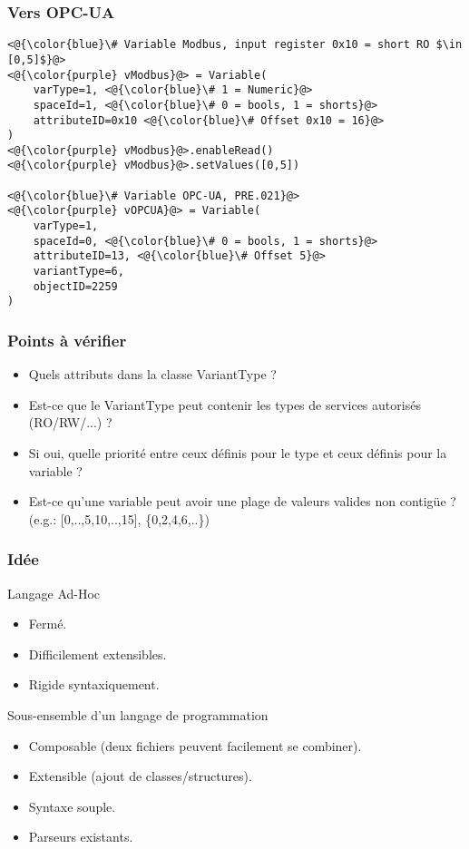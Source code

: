\documentclass{beamer}
\begin{document}
\begin{frame}[fragile]
    \frametitle{Vers OPC-UA}

    \begin{lstlisting}
<@{\color{blue}\# Variable Modbus, input register 0x10 = short RO $\in [0,5]$}@>
<@{\color{purple} vModbus}@> = Variable(
    varType=1, <@{\color{blue}\# 1 = Numeric}@>
    spaceId=1, <@{\color{blue}\# 0 = bools, 1 = shorts}@>
    attributeID=0x10 <@{\color{blue}\# Offset 0x10 = 16}@>
)
<@{\color{purple} vModbus}@>.enableRead()
<@{\color{purple} vModbus}@>.setValues([0,5])

<@{\color{blue}\# Variable OPC-UA, PRE.021}@>
<@{\color{purple} vOPCUA}@> = Variable(
    varType=1,
    spaceId=0, <@{\color{blue}\# 0 = bools, 1 = shorts}@>
    attributeID=13, <@{\color{blue}\# Offset 5}@>
    variantType=6,
    objectID=2259
)
    \end{lstlisting}
\end{frame}

\begin{frame}
    \frametitle{Points à vérifier}

    \begin{itemize}
        \item Quels attributs dans la classe VariantType ?
            \vfill
        \item Est-ce que le VariantType peut contenir les types de services autorisés (RO/RW/...) ?
            \vfill
        \item Si oui, quelle priorité entre ceux définis pour le type et ceux définis pour la variable ?
            \vfill
        \item Est-ce qu'une variable peut avoir une plage de valeurs valides non contigüe ? (e.g.: [0,..,5,10,..,15], \{0,2,4,6,..\})
    \end{itemize}
\end{frame}

\begin{frame}
    \frametitle{Idée}
    
    \begin{block}{Langage Ad-Hoc}
        \begin{itemize}
            \item Fermé.
            \item Difficilement extensibles.
            \item Rigide syntaxiquement.
        \end{itemize}
    \end{block}
    \vfill
    \begin{block}{Sous-ensemble d'un langage de programmation}
        \begin{itemize}
            \item Composable (deux fichiers peuvent facilement se combiner).
            \item Extensible (ajout de classes/structures).
            \item Syntaxe souple.
            \item Parseurs existants.
        \end{itemize}
    \end{block}
\end{frame}
\end{document}
